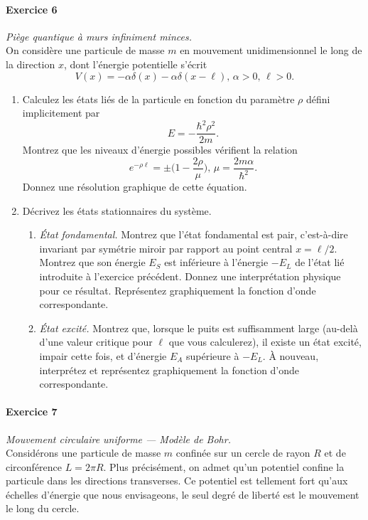 \paragraph{Exercice 6} \textit{Piège quantique à murs infiniment minces.} \\
On considère une particule de masse $m$ en mouvement unidimensionnel le long de la direction $x$, dont l'énergie potentielle s'écrit
\begin{equation}
V(x) = -\alpha \delta(x)-\alpha \delta(x-\ell), \, \alpha>0,\, \ell >0.
\end{equation}
\begin{enumerate}
\item Calculez les états liés de la particule en fonction du paramètre $\rho$ défini implicitement par 
\begin{equation}
E = -\frac{\hbar^2\rho^2}{2m}.
\end{equation}
Montrez que les niveaux d'énergie possibles vérifient la relation
\begin{equation}
e^{-\rho\ell} = \pm \Big( 1 - \frac{2\rho}{\mu} \Big), \,\mu = \frac{2m\alpha}{\hbar^2}.
\end{equation}
Donnez une résolution graphique de cette équation.
\item Décrivez les états stationnaires du système.
	\begin{enumerate}
	\item \textit{État fondamental.} Montrez que l'état fondamental est pair, c'est-à-dire invariant par symétrie miroir par rapport au point central $x=\ell/2$. Montrez que son énergie $E_S$ est inférieure à l'énergie $-E_L$ de l'état lié introduite à l'exercice précédent. Donnez une interprétation physique pour ce résultat. Représentez graphiquement la fonction d'onde correspondante.
	\item \textit{État excité.} Montrez que, lorsque le puits est suffisamment large (au-delà d'une valeur critique pour $\ell$ que vous calculerez), il existe un état excité, impair cette fois, et d'énergie $E_A$ supérieure à $-E_L$. À nouveau, interprétez et représentez graphiquement la fonction d'onde correspondante.
	\end{enumerate}
\end{enumerate}

\paragraph{Exercice 7} \textit{Mouvement circulaire uniforme --- Modèle de Bohr.}  \\
Considérons une particule de masse $m$ confinée sur un cercle de rayon $R$ et de circonférence $L = 2\pi R$. Plus précisément, on admet qu'un potentiel confine la particule dans les directions transverses. Ce potentiel est tellement fort qu'aux échelles d'énergie que nous envisageons, le seul degré de liberté est le mouvement le long du cercle.\\

